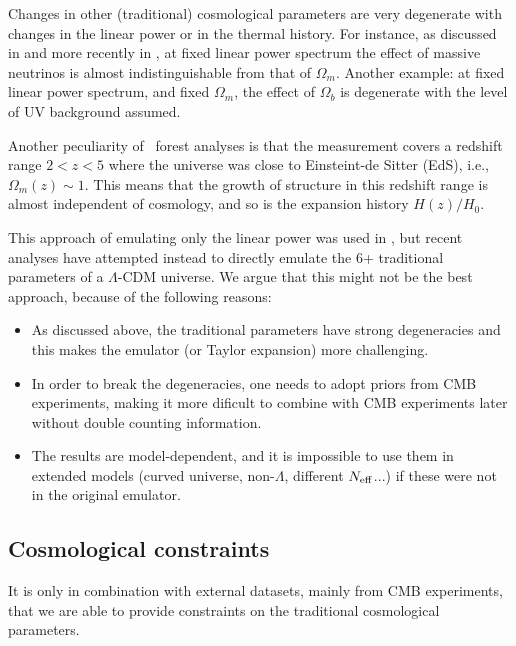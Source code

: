 Changes in other (traditional) cosmological parameters are very degenerate
with changes in the linear power or in the thermal history.
For instance, as discussed in \cite{Viel2010} and more recently in
\cite{Pedersen2018}, at fixed linear power spectrum the effect of massive
neutrinos is almost indistinguishable from that of $\Omega_m$.
Another example: at fixed linear power spectrum, and fixed $\Omega_m$, the
effect of $\Omega_b$ is degenerate with the level of UV background assumed.

Another peculiarity of \lya\ forest analyses is that the measurement
covers a redshift range $2 < z < 5$ where the universe was close
to Einsteint-de Sitter (EdS), i.e., $\Omega_m(z) \sim 1$.
This means that the growth of structure in this redshift range is almost
independent of cosmology, and so is the expansion history $H(z)/H_0$.

This approach of emulating only the linear power was used in
\cite{McDonald2005a}, but recent analyses
\cite{Palanque-Delabrouille2015,Yeche2017} have attempted instead to
directly emulate the 6+ traditional parameters of a $\Lambda$-CDM universe.
We argue that this might not be the best approach, because of the
following reasons:
\begin{itemize}
 \item As discussed above, the traditional parameters have strong degeneracies
  and this makes the emulator (or Taylor expansion) more challenging.
 \item In order to break the degeneracies, one needs to adopt priors from
  CMB experiments, making it more dificult to combine with CMB experiments
  later without double counting information.
 \item The results are model-dependent, and it is impossible to use them in
  extended models (curved universe, non-$\Lambda$, different $N_{\rm eff}$...)
  if these were not in the original emulator.
\end{itemize}


\subsection{Cosmological constraints}

It is only in combination with external datasets, mainly from CMB experiments,
that we are able to provide constraints on the traditional cosmological
parameters.

